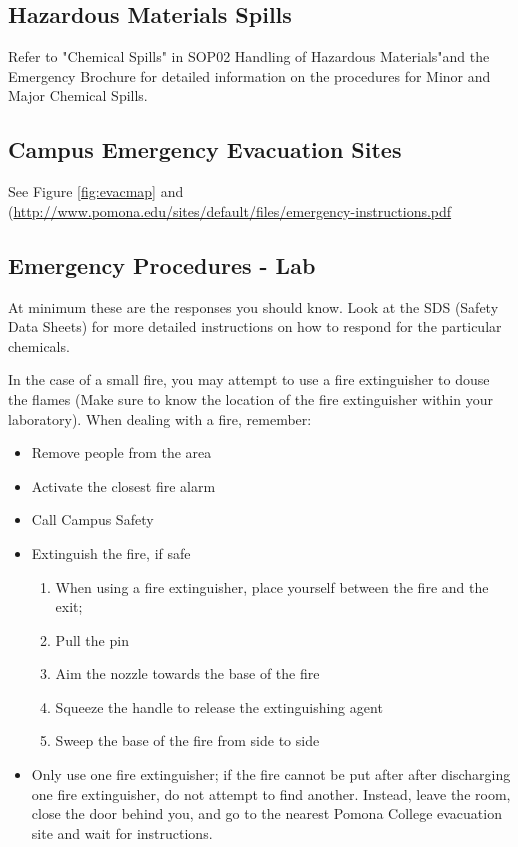\documentclass[12pt]{../SOP2}
\begin{document}
\subsection{Hazardous Materials Spills}

\NP Refer to "Chemical Spills" in SOP02 Handling of Hazardous Materials"and the Emergency Brochure for detailed information on the procedures for Minor and Major Chemical Spills.

\subsection{Campus Emergency Evacuation Sites}

See Figure \ref{fig:evacmap} and (\href{Pomona College Emergiency Instruction}{http://www.pomona.edu/sites/default/files/emergency-instructions.pdf}

\subsection*{Emergency Procedures - Lab}

\NP At minimum these are the responses you should know. Look at the SDS (Safety Data Sheets) for more detailed instructions on how to respond for the particular chemicals.  

\NP In the case of a small fire, you may attempt to use a fire extinguisher to douse the flames (Make sure to know the location of the fire extinguisher within your laboratory). 
When dealing with a fire, remember:

\begin{itemize}
  \item Remove people from the area
  \item Activate the closest fire alarm
  \item Call Campus Safety
  \item Extinguish the fire, if safe
    \begin{enumerate}
      \item When using a fire extinguisher, place yourself between the fire and the exit; 
	    \item Pull the pin
	    \item Aim the nozzle towards the base of the fire
	    \item Squeeze the handle to release the extinguishing agent
	    \item Sweep the base of the fire from side to side
    \end{enumerate}

  \item Only use one fire extinguisher; if the fire cannot be put after after discharging one fire extinguisher, do not attempt to find another. Instead, leave the room, close the door behind you, and go to the nearest Pomona College evacuation site and wait for instructions.
  
\end{itemize}
\end{document}
